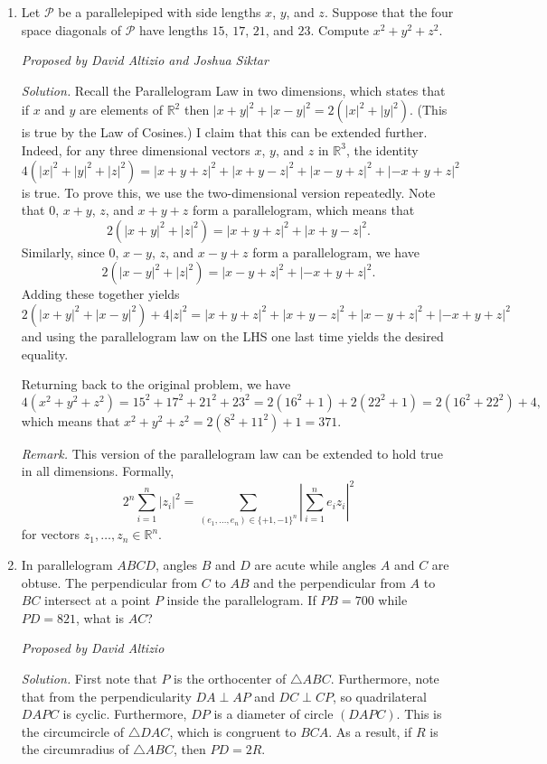 \documentclass[10pt]{article}
\newcommand{\proposed}[1]
{
\vspace{5pt}
\noindent\textit{Proposed by #1}
}
\newcommand{\solution}
{
\vspace{5pt}
\noindent\textit{Solution.}\qquad
}
\newcounter{enum}
\begin{document}
\begin{enumerate}
\setcounter{enumi}{\theenum}

\item Let $\mathcal{P}$ be a parallelepiped with side lengths $x$, $y$, and $z$.  Suppose that the four space diagonals of $\mathcal{P}$ have lengths $15$, $17$, $21$, and $23$.  Compute $x^2+y^2+z^2$.

\proposed{David Altizio and Joshua Siktar}

\solution Recall the Parallelogram Law in two dimensions, which states that if $x$ and $y$ are elements of $\mathbb{R}^2$ then $|x+y|^2+|x-y|^2=2(|x|^2+|y|^2)$.  (This is true by the Law of Cosines.)  I claim that this can be extended further.  Indeed, for any three dimensional vectors $x$, $y$, and $z$ in $\mathbb{R}^3$, the identity \[4(|x|^2+|y|^2+|z|^2)=|x+y+z|^2+|x+y-z|^2+|x-y+z|^2+| -x+y+z|^2\] is true.  To prove this, we use the two-dimensional version repeatedly.  Note that $0$, $x+y$, $z$, and $x+y+z$ form a parallelogram, which means that \[2(|x+y|^2+|z|^2)=|x+y+z|^2+|x+y-z|^2.\] Similarly, since $0$, $x-y$, $z$, and $x-y+z$ form a parallelogram, we have \[2(|x-y|^2+|z|^2)=|x-y+z|^2+| -x+y+z|^2.\] Adding these together yields \[2(|x+y|^2+|x-y|^2)+4|z|^2=|x+y+z|^2+|x+y-z|^2+|x-y+z|^2+| -x+y+z|^2\] and using the parallelogram law on the LHS one last time yields the desired equality.

\par Returning back to the original problem, we have \[4(x^2+y^2+z^2)=15^2+17^2+21^2+23^2=2(16^2+1)+2(22^2+1)=2(16^2+22^2) + 4,\] which means that $x^2+y^2+z^2=2(8^2+11^2)+1=\boxed{371}$.

\par\textit{Remark.} This version of the parallelogram law can be extended to hold true in all dimensions.  Formally, \[2^n\sum_{i=1}^n|z_i|^2=\sum_{(e_1,\ldots, e_n)\in\{+1,-1\}^n}\left|\sum_{i=1}^ne_iz_i\right|^2\] for vectors $z_1,\ldots,z_n\in\mathbb{R}^n$.

\item In parallelogram $ABCD$, angles $B$ and $D$ are acute while angles $A$ and $C$ are obtuse.  The perpendicular from $C$ to $AB$ and the perpendicular from $A$ to $BC$ intersect at a point $P$ inside the parallelogram.  If $PB=700$ while $PD=821$, what is $AC$?

\proposed{David Altizio}

\solution First note that $P$ is the orthocenter of $\triangle ABC$.  Furthermore, note that from the perpendicularity $DA\perp AP$ and $DC\perp CP$, so quadrilateral $DAPC$ is cyclic.  Furthermore, $DP$ is a diameter of circle $(DAPC)$.  This is the circumcircle of $\triangle DAC$, which is congruent to $BCA$.  As a result, if $R$ is the circumradius of $\triangle ABC$, then $PD=2R$.


\end{enumerate}
\end{document}

